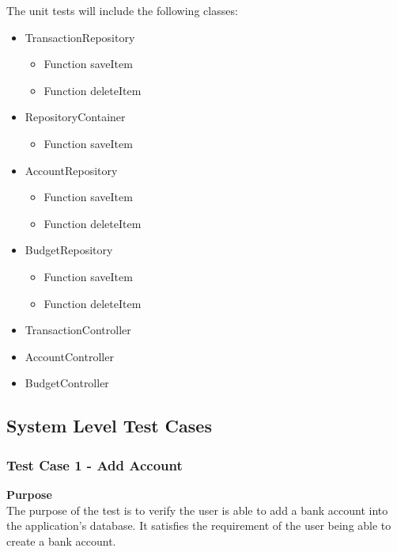 \documentclass[12pt]{article}
\begin{document}
\setlength{\parskip}{0.8mm}
The unit tests will include the following classes:
\begin {itemize}
	\item TransactionRepository
	\begin {itemize}
		\item Function saveItem
		\item Function deleteItem
	\end {itemize}
	\item RepositoryContainer
	\begin {itemize}
		\item Function saveItem
	\end {itemize}
	\item AccountRepository
	\begin {itemize}
		\item Function saveItem
		\item Function deleteItem
	\end {itemize}
	\item BudgetRepository
	\begin {itemize}
		\item Function saveItem
		\item Function deleteItem
	\end {itemize}
	\item TransactionController
	\item AccountController
	\item BudgetController
\end {itemize}



\clearpage
\subsection{System Level Test Cases}



\subsubsection {Test Case 1 - Add Account} \label{TC-1}

\noindent
{\bf Purpose}\\
The purpose of the test is to verify the user is able to add a bank account into the application's database.
It satisfies the requirement of the user being able to create a bank account.
\end{document}
